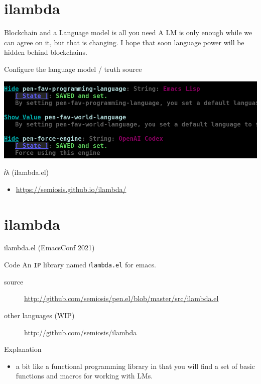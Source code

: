 \documentclass[presentation]{beamer}
\begin{document}
\section{ilambda}
\label{sec:org8015b4c}
\begin{frame}[label={sec:orgc23f22c}]{Blockchain and a Language model is all you need}
A LM is only enough while we can agree on it,
but that is changing. I hope that soon
language power will be hidden behind
blockchains.

\begin{block}{Configure the language model / truth source}
\begin{center}
\includegraphics[width=.9\linewidth]{./configure-model.png}
\end{center}
\end{block}

\begin{block}{𝑖λ (ilambda.el)}
\begin{itemize}
\item \url{https://semiosis.github.io/ilambda/}
\end{itemize}
\end{block}
\end{frame}

\section{ilambda}
\label{sec:orgc41cf43}
\begin{frame}[label={sec:org0239953},fragile]{ilambda.el (EmacsConf 2021)}
 \begin{block}{Code}
An \texttt{IP} library named \texttt{𝑖lambda.el} for emacs.

\begin{description}
\item[{source}] \url{http://github.com/semiosis/pen.el/blob/master/src/ilambda.el}
\item[{other languages (WIP)}] \url{http://github.com/semiosis/ilambda}
\end{description}
\end{block}

\begin{block}{Explanation}
\begin{itemize}
\item a bit like a functional programming library
in that you will find a set of basic functions and
macros for working with LMs.
\end{itemize}
\end{block}
\end{frame}
\end{document}
